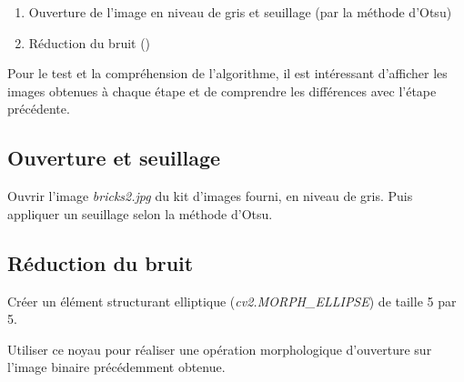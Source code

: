 \documentclass[a4paper,11pt,titlepage]{article} %
\begin{document}
\begin{enumerate}
	\item Ouverture de l'image en niveau de gris et seuillage (par la méthode d'Otsu)
	\item Réduction du bruit ()
	
\end{enumerate}

Pour le test et la compréhension de l'algorithme, il est intéressant d'afficher les images obtenues à chaque étape et de comprendre les différences avec l'étape précédente.
	
\subsection{Ouverture et seuillage}

\Manip Ouvrir l'image \textsl{bricks2.jpg} du kit d'images fourni, en niveau de gris. Puis appliquer un seuillage selon la méthode d'Otsu.

\subsection{Réduction du bruit}

\Manip Créer un élément structurant elliptique (\textsl{cv2.MORPH\_ELLIPSE}) de taille 5 par 5.

\Manip Utiliser ce noyau pour réaliser une opération morphologique d'ouverture sur l'image binaire précédemment obtenue. 



\end{document}
